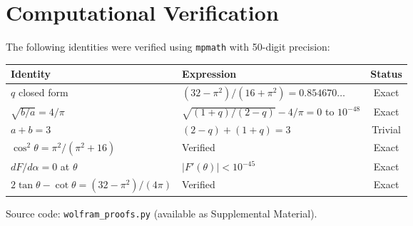 \documentclass[12pt,a4paper]{article}
\begin{document}
\section{Computational Verification}
\label{app:computation}

The following identities were verified using \texttt{mpmath} with 50-digit precision:

\begin{center}
\begin{tabular}{@{}llc@{}}
\toprule
Identity & Expression & Status \\
\midrule
$q$ closed form & $(32 - \pi^2)/(16 + \pi^2) = 0.854670\ldots$ & Exact \\
$\sqrt{b/a} = 4/\pi$ & $\sqrt{(1+q)/(2-q)} - 4/\pi = 0$ to $10^{-48}$ & Exact \\
$a + b = 3$ & $(2 - q) + (1 + q) = 3$ & Trivial \\
$\cos^2\theta = \pi^2/(\pi^2 + 16)$ & Verified & Exact \\
$dF/d\alpha = 0$ at $\theta$ & $|F'(\theta)| < 10^{-45}$ & Exact \\
$2\tan\theta - \cot\theta = (32-\pi^2)/(4\pi)$ & Verified & Exact \\
\bottomrule
\end{tabular}
\end{center}

\noindent Source code: \texttt{wolfram\_proofs.py} (available as Supplemental Material).
\end{document}
